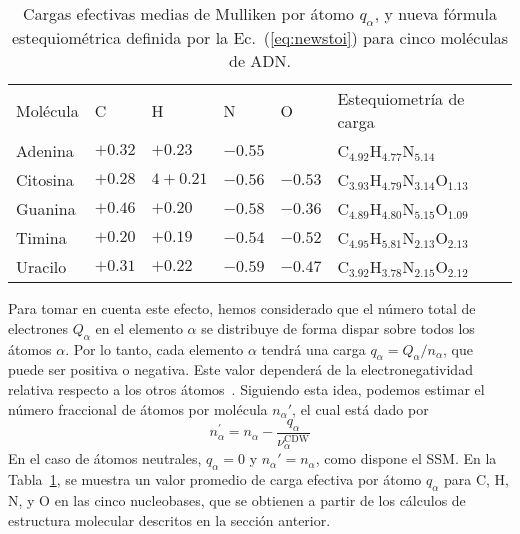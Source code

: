 \begin{table}
\begin{center}
\begin{tabularx}{\textwidth}{
>{\centering\arraybackslash}p{}
>{\centering\arraybackslash}p{}
>{\centering\arraybackslash}p{}
>{\centering\arraybackslash}p{}
>{\centering\arraybackslash}p{}
>{\centering\arraybackslash}p{}}
\rowcolor{mydarkgray} 
Molécula & C & H & N & O & Estequiometría de carga \\
Adenina & $+0.32$ & $+0.23$ & $-0.55$ &       & 
C$_{4.92}$H$_{4.77}$N$_{5.14}$ \\ 
\rowcolor{mygray} 
Citosina & $+0.28$ & $4+0.21$ & $-0.56$ & $-0.53$ & 
C$_{3.93}$H$_{4.79}$N$_{3.14}$O$_{1.13}$ \\ 
Guanina & $+0.46$ & $+0.20$ & $-0.58$ & $-0.36$ & 
C$_{4.89}$H$_{4.80}$N$_{5.15}$O$_{1.09}$ \\ 
\rowcolor{mygray} 
Timina & $+0.20$ & $+0.19$ & $-0.54$ & $-0.52$ & 
C$_{4.95}$H$_{5.81}$N$_{2.13}$O$_{2.13}$ \\ 
Uracilo & $+0.31$ & $+0.22$ & $-0.59$ & $-0.47$ & 
C$_{3.92}$H$_{3.78}$N$_{2.15}$O$_{2.12}$ \\ 
\end{tabularx}
\caption[Cargas efectivas medias de Mulliken por átomo]
{Cargas efectivas medias de Mulliken por átomo $q_{\alpha}$, y nueva 
fórmula estequiométrica definida por la Ec.~(\ref{eq:newstoi}) para 
cinco moléculas de ADN.}
\label{tab:newstoi}
\end{center}
\end{table}

Para tomar en cuenta este efecto, hemos considerado que el número total 
de electrones $Q_{\alpha }$ en el elemento $\alpha$ se distribuye de 
forma dispar sobre todos los átomos $\alpha$. Por lo tanto, cada 
elemento $\alpha$ tendrá una carga $q_{\alpha}=Q_{\alpha}/n_{\alpha}$, 
que puede ser positiva o negativa. Este valor dependerá de la 
electronegatividad relativa respecto a los otros átomos~\cite{rappe1991}. 
Siguiendo esta idea, podemos estimar el número fraccional de átomos por 
molécula $n_{\alpha}'$, el cual está dado por 
\begin{equation}
n_{\alpha }^{\prime }=n_{\alpha }-
\frac{q_{\alpha }}{\nu_{\alpha }^{\text{CDW}}}
\label{eq:newstoi}
\end{equation}
En el caso de átomos neutrales, $q_{\alpha}=0$ y 
$n_{\alpha}'=n_{\alpha}$, como dispone el SSM. En la 
Tabla~\ref{tab:newstoi}, se muestra un valor promedio de carga efectiva 
por átomo $q_{\alpha}$ para C, H, N, y O en las cinco nucleobases, que 
se obtienen a partir de los cálculos de estructura molecular descritos 
en la sección anterior.

